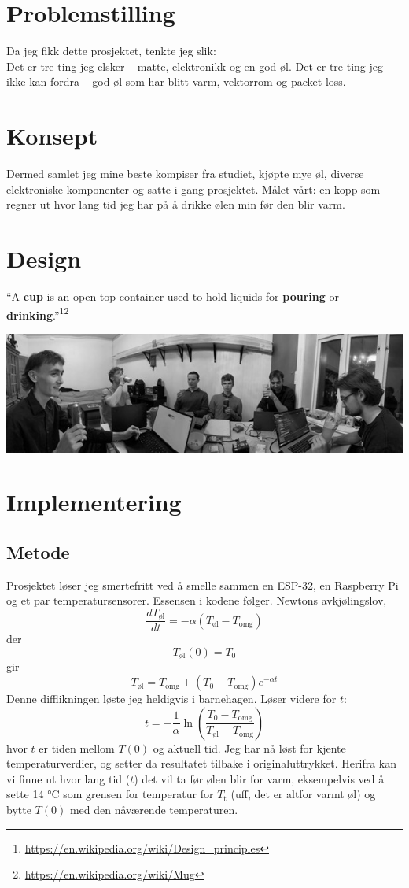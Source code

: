 \documentclass{article}
\begin{document}
\section{Problemstilling}
\label{Problemstilling}
Da jeg fikk dette prosjektet, tenkte jeg slik:\\
Det er tre ting jeg elsker – matte, elektronikk og en god øl.  
Det er tre ting jeg ikke kan fordra – god øl som har blitt varm, vektorrom og packet loss.

\section{Konsept}
\label{Konsept}
Dermed samlet jeg mine beste kompiser fra studiet, kjøpte mye øl, diverse elektroniske komponenter og satte i gang prosjektet.  
Målet vårt: en kopp som regner ut hvor lang tid jeg har på å drikke ølen min før den blir varm.

\section{Design}
\label{Design}
``A \textbf{cup} is an open-top container used to hold liquids for \textbf{pouring} or \textbf{drinking}.''\footnote{\url{https://en.wikipedia.org/wiki/Design_principles}}\footnote{\url{https://en.wikipedia.org/wiki/Mug}}
\vfill
\begin{center}
    \includegraphics[width=\textwidth]{Panorama_pilsing.jpg}
\end{center}
\newpage
\section{Implementering}
\label{Implementering}
\subsection{Metode}
\label{Metode}
Prosjektet løser jeg smertefritt ved å smelle sammen en ESP-32, en Raspberry Pi og et par temperatursensorer. Essensen i kodene følger.
Newtons avkjølingslov,
\[ 
\frac{dT_{\text{øl}}}{dt} = -\alpha(T_{\text{øl}} - T_{\text{omg}})
\]
der
\[ 
T_{\text{øl}}(0) = T_{0}
\]
gir
\[ 
T_{\text{øl}} = T_{\text{omg}} + (T_{0} - T_{\text{omg}})e^{-\alpha t}
\]
Denne difflikningen løste jeg heldigvis i barnehagen.
Løser videre for \(t\):
\[ 
t = -\frac{1}{\alpha} \ln \left(\frac{T_{0} - T_{\text{omg}}}{T_{\text{øl}} - T_{\text{omg}}}\right)
\]
hvor \(t\) er tiden mellom \(T(0)\) og aktuell tid. Jeg har nå løst for kjente temperaturverdier, og setter da resultatet tilbake i originaluttrykket. Herifra kan vi finne ut hvor lang tid (\(t\)) det vil ta før ølen blir for varm, eksempelvis ved å sette 14 °C som grensen for temperatur for \(T_{\text{t}}\) (uff, det er altfor varmt øl) og bytte \(T(0)\) med den nåværende temperaturen.\\
\end{document}

